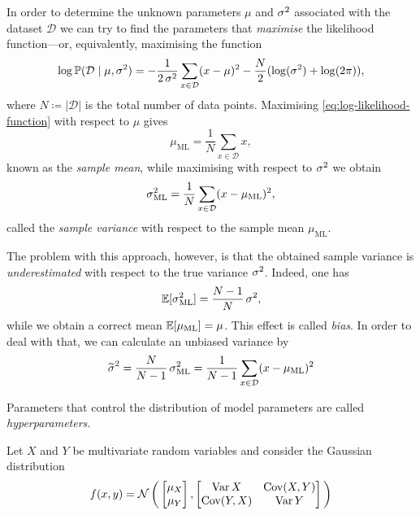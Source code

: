 \begin{remark}
\label{rem:find-mean-and-variance-with-maximum-likelihood}
In order to determine the unknown parameters \(\mu\) and \(\operatorname{\sigma}^2\) associated
with the dataset \(\mathcal{D}\) we can try to find the parameters that
\emph{maximise} the likelihood function---or, equivalently, maximising the
function
\begin{equation}\label{eq:log-likelihood-function}
\log \operatorname{\mathbb{P}}(\mathcal{D} \mid \mu, \operatorname{\sigma}^2)
= - \frac{1}{2 \operatorname{\sigma}^{2}}
\sum_{x \in \mathcal{D}} (x - \mu)^2 - \frac{N}{2}(\log(\operatorname{\sigma}^2) + \log(2 \pi)),
\end{equation}
where \(N \coloneq |\mathcal{D}|\) is the total number of data points.
Maximising \cref{eq:log-likelihood-function} with respect to \(\mu\) gives
\[
\mu_{\text{ML}} = \frac{1}{N} \sum_{x \in \mathcal{D}} x,
\]
known as the \emph{sample mean}, while maximising with respect to \(\operatorname{\sigma}^2\)
we obtain
\[
\operatorname{\sigma}^2_{\text{ML}} = \frac{1}{N} \sum_{x \in \mathcal{D}} (x - \mu_{\text{ML}})^2,
\]
called the \emph{sample variance} with respect to the sample mean
\(\mu_{\text{ML}}\).

The problem with this approach, however, is that the obtained sample variance is
\emph{underestimated} with respect to the true variance \(\operatorname{\sigma}^2\). Indeed,
one has
\[
\operatorname{\mathbb{E}}[\operatorname{\sigma}^2_{\text{ML}}] = \frac{N-1}{N} \operatorname{\sigma}^2,
\]
while we obtain a correct mean \(\operatorname{\mathbb{E}}[\mu_{\text{ML}}] = \mu\). This effect
is called \emph{bias}. In order to deal with that, we can calculate an unbiased
variance by
\[
\widetilde{\operatorname{\sigma}}^2 = \frac{N}{N-1} \operatorname{\sigma}^2_{\text{ML}}
= \frac{1}{N-1} \sum_{x \in \mathcal{D}} (x - \mu_{\text{ML}})^2
\]
\end{remark}

\begin{definition}[Hyperparameters]
\label{def:hyperparameters}
Parameters that control the distribution of model parameters are called
\emph{hyperparameters}.
\end{definition}

Let \(X\) and \(Y\) be multivariate random variables and consider the
Gaussian distribution
\[
f(x, y) = \operatorname{\mathcal{N}}\bigg(
\begin{bmatrix}
  \mu_X \\
  \mu_Y
\end{bmatrix},
\begin{bmatrix}
  \operatorname{Var} X     & \operatorname{Cov}(X, Y) \\
  \operatorname{Cov}(Y, X) & \operatorname{Var} Y
\end{bmatrix}
\bigg)
\]

